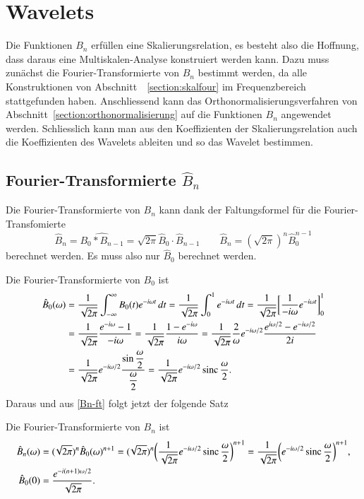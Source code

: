 %
%
%
\section{Wavelets
\label{section:spline-wavelets}}
Die Funktionen $B_n$ erfüllen eine Skalierungsrelation, es besteht also
die Hoffnung, dass daraus eine Multiskalen-Analyse konstruiert werden kann.
Dazu muss zunächst die Fourier-Transformierte von $B_n$ bestimmt werden,
da alle Konstruktionen von Abschnitt~ \ref{section:skalfour} im
Frequenzbereich stattgefunden haben.
Anschliessend kann das Orthonormalisierungsverfahren von
Abschnitt~\ref{section:orthonormalisierung} auf die Funktionen $B_n$
angewendet werden.
Schliesslich kann man aus den Koeffizienten der Skalierungsrelation
auch die Koeffizienten des Wavelets ableiten und so das Wavelet
bestimmen.

\subsection{Fourier-Transformierte $\hat{B}_n$
\label{subsection:spline-ft}}
Die Fourier-Transformierte von $B_n$ kann dank der Faltungsformel für die
Fourier-Transfomierte 
\begin{equation}
\hat{B}_n = \widehat{B_0 * B_{n-1}} = \sqrt{2\pi}\hat{B}_0 \cdot \hat{B}_{n-1}
\qquad
\hat{B}_n = (\!\sqrt{2\pi})^n \hat{B}_0^{n-1}
\label{Bn-ft}
\end{equation}
berechnet werden.
Es muss also nur $\hat{B}_0$ berechnet werden.

Die Fourier-Transformierte von $B_0$ ist
\begin{align*}
\hat{B}_0(\omega)
&=
\frac1{\sqrt{2\pi}}
\int_{-\infty}^{\infty}
B_0(t) e^{-i\omega t}\,dt
=
\frac1{\sqrt{2\pi}}
\int_0^1 e^{-i\omega t}\,dt
=
\frac1{\sqrt{2\pi}}
\biggl[
\frac{1}{-i\omega} 
e^{-i\omega t}
\biggr]_0^1
\\
&=
\frac1{\sqrt{2\pi}}
\frac{e^{-i\omega}-1}{-i\omega}
=
\frac1{\sqrt{2\pi}}
\frac{1-e^{-i\omega}}{i\omega}
=
\frac1{\sqrt{2\pi}}
\frac{2}{\omega}
e^{-i\omega/2}
\frac{e^{i\omega/2} - e^{-i\omega/2}}{2i}
\\
&=
\frac1{\sqrt{2\pi}}
e^{-i\omega/2}
\frac{\displaystyle\sin\frac{\omega}2}{\displaystyle\frac{\omega}2}
=
\frac1{\sqrt{2\pi}}
e^{-i\omega/2}
\sinc\frac{\omega}2.
\end{align*}
Daraus und aus \eqref{Bn-ft} folgt jetzt der folgende Satz

\begin{satz}
\label{satz:Bn-ft}
Die Fourier-Transformierte von $B_n$ ist
\begin{align*}
\hat{B}_n(\omega)
&=
(\!\sqrt{2\pi})^n
\hat{B}_0(\omega)^{n+1}
=
(\!\sqrt{2\pi})^n
\biggl(
\frac{1}{\sqrt{2\pi}}
e^{-i\omega/2} \sinc\frac{\omega}2
\biggr)^{n+1}
=
\frac{1}{\sqrt{2\pi}}
\biggl(
e^{-i\omega/2} \sinc\frac{\omega}2
\biggr)^{n+1},
\\
\hat{B}_0(0)
&=
\frac{e^{-i(n+1)\omega/2}}{\sqrt{2\pi}}.
\end{align*}
\end{satz}


